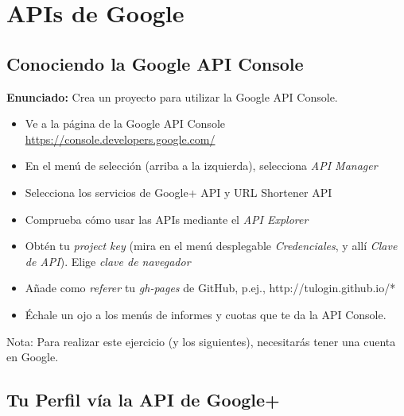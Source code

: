 \section{APIs de Google}

\subsection{Conociendo la Google API Console}
\label{subsec:conociendo-google-api-console}

\textbf{Enunciado:} Crea un proyecto para utilizar la Google API Console.

\begin{itemize}
  \item Ve a la página de la Google API Console \url{https://console.developers.google.com/}
  \item En el menú de selección (arriba a la izquierda), selecciona \emph{API Manager}
  \item Selecciona los servicios de Google+ API y URL Shortener API
  \item Comprueba cómo usar las APIs mediante el \emph{API Explorer}
  \item Obtén tu \emph{project key} (mira en el menú desplegable \emph{Credenciales}, y allí \emph{Clave de API}). Elige \emph{clave de navegador} 
  \item Añade como \emph{referer} tu \emph{gh-pages} de GitHub, p.ej., http://tulogin.github.io/*
  \item Échale un ojo a los menús de informes y cuotas que te da la API Console.
\end{itemize}

Nota: Para realizar este ejercicio (y los siguientes), necesitarás tener
una cuenta en Google.

\subsection{Tu Perfil vía la API de Google+}
\label{subsec:tu-perfil-en-googleplus}

